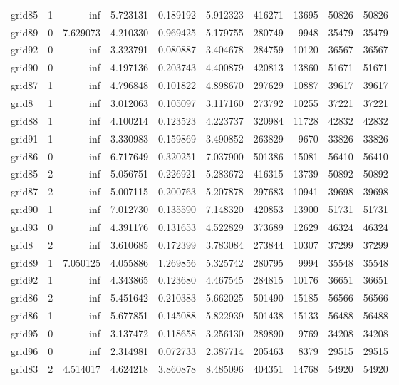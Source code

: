 \begin{longtable}{|l|r|r|r|r|r|r|r|r|r|}
grid85 & 1 & inf & 5.723131 & 0.189192 & 5.912323 & 416271 & 13695 & 50826 & 50826 \\
grid89 & 0 & 7.629073 & 4.210330 & 0.969425 & 5.179755 & 280749 & 9948 & 35479 & 35479 \\
grid92 & 0 & inf & 3.323791 & 0.080887 & 3.404678 & 284759 & 10120 & 36567 & 36567 \\
grid90 & 0 & inf & 4.197136 & 0.203743 & 4.400879 & 420813 & 13860 & 51671 & 51671 \\
grid87 & 1 & inf & 4.796848 & 0.101822 & 4.898670 & 297629 & 10887 & 39617 & 39617 \\
grid8 & 1 & inf & 3.012063 & 0.105097 & 3.117160 & 273792 & 10255 & 37221 & 37221 \\
grid88 & 1 & inf & 4.100214 & 0.123523 & 4.223737 & 320984 & 11728 & 42832 & 42832 \\
grid91 & 1 & inf & 3.330983 & 0.159869 & 3.490852 & 263829 & 9670 & 33826 & 33826 \\
grid86 & 0 & inf & 6.717649 & 0.320251 & 7.037900 & 501386 & 15081 & 56410 & 56410 \\
grid85 & 2 & inf & 5.056751 & 0.226921 & 5.283672 & 416315 & 13739 & 50892 & 50892 \\
grid87 & 2 & inf & 5.007115 & 0.200763 & 5.207878 & 297683 & 10941 & 39698 & 39698 \\
grid90 & 1 & inf & 7.012730 & 0.135590 & 7.148320 & 420853 & 13900 & 51731 & 51731 \\
grid93 & 0 & inf & 4.391176 & 0.131653 & 4.522829 & 373689 & 12629 & 46324 & 46324 \\
grid8 & 2 & inf & 3.610685 & 0.172399 & 3.783084 & 273844 & 10307 & 37299 & 37299 \\
grid89 & 1 & 7.050125 & 4.055886 & 1.269856 & 5.325742 & 280795 & 9994 & 35548 & 35548 \\
grid92 & 1 & inf & 4.343865 & 0.123680 & 4.467545 & 284815 & 10176 & 36651 & 36651 \\
grid86 & 2 & inf & 5.451642 & 0.210383 & 5.662025 & 501490 & 15185 & 56566 & 56566 \\
grid86 & 1 & inf & 5.677851 & 0.145088 & 5.822939 & 501438 & 15133 & 56488 & 56488 \\
grid95 & 0 & inf & 3.137472 & 0.118658 & 3.256130 & 289890 & 9769 & 34208 & 34208 \\
grid96 & 0 & inf & 2.314981 & 0.072733 & 2.387714 & 205463 & 8379 & 29515 & 29515 \\
grid83 & 2 & 4.514017 & 4.624218 & 3.860878 & 8.485096 & 404351 & 14768 & 54920 & 54920 \\

\end{longtable}
